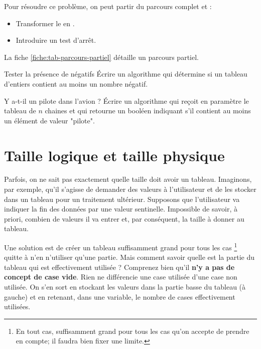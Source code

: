 			Pour résoudre ce problème,
			on peut partir du parcours complet et :
			\begin{itemize}
			\item
				Transformer le  en .
			\item
				Introduire un test d'arrêt.
			\end{itemize}
			La fiche \vref{fiche:tab-parcours-partiel}
			détaille un parcours partiel.
				
			\begin{Exercice}{Tester la présence de négatifs}
				Écrire un algorithme qui
				détermine si un tableau d'entiers contient au moins un nombre négatif.
			\end{Exercice}

			\begin{Exercice}{Y a-t-il un pilote dans l'avion ?}
				Écrire un algorithme qui reçoit en paramètre le tableau
				 de $n$ chaines 
				et qui retourne un booléen 
				indiquant s'il contient au moins un élément de 
				valeur "pilote". 
			\end{Exercice}
		
	\section{Taille logique et taille physique} 

		Parfois, on ne sait pas exactement 
		quelle taille doit avoir un tableau.
		Imaginons, par exemple,
		qu'il s'agisse de demander des valeurs à l'utilisateur
		et de les stocker dans un tableau pour un traitement ultérieur.
		Supposons que l'utilisateur va indiquer la fin des données
		par une valeur sentinelle.
		Impossible de savoir, à priori, combien de valeurs il va entrer
		et, par conséquent, la taille à donner au tableau.
		
		Une solution est de créer un tableau suffisamment grand
		pour tous les cas%
		\footnote{%
			En tout cas, 
			suffisamment grand pour tous les cas qu'on accepte
			de prendre en compte; il faudra bien fixer une limite.
		} 
		quitte à n'en n'utiliser qu'une partie.
		Mais comment savoir quelle est la partie du tableau
		qui est effectivement utilisée ?
		Comprenez bien qu'il \textbf{n'y a pas de concept de case vide}.
		Rien ne différencie une case utilisée d'une case non utilisée.
		On s'en sort en stockant les valeurs 
		dans la partie basse du tableau (à gauche)
		et en retenant, dans une variable,
		le nombre de cases effectivement utilisées.
			
